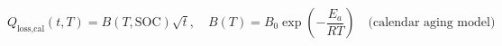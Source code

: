 \documentclass[preview]{standalone}
\begin{document}
\[Q_\text{loss,cal}(t,T) = B(T,\text{SOC})\sqrt{t}, \quad B(T) = B_0\exp\!\left(-\frac{E_a}{RT}\right) \quad \text{(calendar aging model)} \tag{7.12}\]
\end{document}
